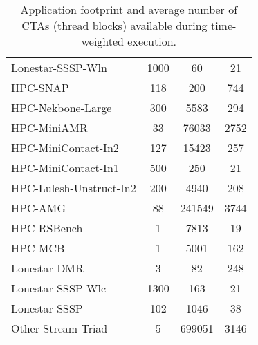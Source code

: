 \begin{table}[t]
\begin{small}
\begin{tabular}{lccc}
Lonestar-SSSP-Wln & 1000 & 60 & 21 \\
HPC-SNAP & 118 & 200 & 744 \\
HPC-Nekbone-Large & 300 & 5583 & 294 \\
HPC-MiniAMR & 33 & 76033 & 2752 \\
HPC-MiniContact-In2 & 127 & 15423 & 257 \\
HPC-MiniContact-In1 & 500 & 250 & 21 \\
HPC-Lulesh-Unstruct-In2 & 200 & 4940 & 208 \\
HPC-AMG & 88 & 241549 & 3744 \\
HPC-RSBench & 1 & 7813 & 19 \\
HPC-MCB & 1 & 5001 & 162 \\
Lonestar-DMR & 3 & 82 & 248 \\
Lonestar-SSSP-Wlc & 1300 & 163 & 21 \\
Lonestar-SSSP & 102 & 1046 & 38 \\
Other-Stream-Triad & 5 & 699051 & 3146 \\
\toprule
\end{tabular}
\caption{Application footprint and average number of CTAs (thread blocks) 
available during time-weighted execution.}
\label{tab:numctas}
\end{small}
\end{table}
